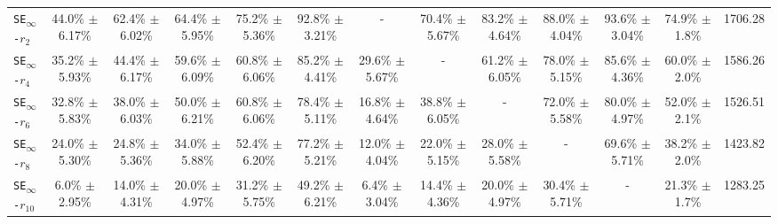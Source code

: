 \begin{table}[ht]
{\begin{tabular}{lcccccccccccc}
\texttt{SE\textsubscript{$\infty$}-$r_2$} & 44.0\% $\pm$ 6.17\% & 62.4\% $\pm$ 6.02\% & 64.4\% $\pm$ 5.95\% & 75.2\% $\pm$ 5.36\% & 92.8\% $\pm$ 3.21\% & - & 70.4\% $\pm$ 5.67\% & 83.2\% $\pm$ 4.64\% & 88.0\% $\pm$ 4.04\% & 93.6\% $\pm$ 3.04\% & 74.9\% $\pm$ 1.8\% & 1706.28\\
\texttt{SE\textsubscript{$\infty$}-$r_4$} & 35.2\% $\pm$ 5.93\% & 44.4\% $\pm$ 6.17\% & 59.6\% $\pm$ 6.09\% & 60.8\% $\pm$ 6.06\% & 85.2\% $\pm$ 4.41\% & 29.6\% $\pm$ 5.67\% & - & 61.2\% $\pm$ 6.05\% & 78.0\% $\pm$ 5.15\% & 85.6\% $\pm$ 4.36\% & 60.0\% $\pm$ 2.0\% & 1586.26\\
\texttt{SE\textsubscript{$\infty$}-$r_6$} & 32.8\% $\pm$ 5.83\% & 38.0\% $\pm$ 6.03\% & 50.0\% $\pm$ 6.21\% & 60.8\% $\pm$ 6.06\% & 78.4\% $\pm$ 5.11\% & 16.8\% $\pm$ 4.64\% & 38.8\% $\pm$ 6.05\% & - & 72.0\% $\pm$ 5.58\% & 80.0\% $\pm$ 4.97\% & 52.0\% $\pm$ 2.1\% & 1526.51\\
\texttt{SE\textsubscript{$\infty$}-$r_8$} &24.0\% $\pm$ 5.30\% & 24.8\% $\pm$ 5.36\% & 34.0\% $\pm$ 5.88\% & 52.4\% $\pm$ 6.20\% & 77.2\% $\pm$ 5.21\% & 12.0\% $\pm$ 4.04\% & 22.0\% $\pm$ 5.15\% & 28.0\% $\pm$ 5.58\% & - & 69.6\% $\pm$ 5.71\% & 38.2\% $\pm$ 2.0\% & 1423.82\\
\texttt{SE\textsubscript{$\infty$}-$r_{10}$} & 6.0\% $\pm$ 2.95\% & 14.0\% $\pm$ 4.31\% & 20.0\% $\pm$ 4.97\% & 31.2\% $\pm$ 5.75\% & 49.2\% $\pm$ 6.21\% & 6.4\% $\pm$ 3.04\% & 14.4\% $\pm$ 4.36\% & 20.0\% $\pm$ 4.97\% & 30.4\% $\pm$ 5.71\% & - & 21.3\% $\pm$ 1.7\% & 1283.25\\
\bottomrule
\end{tabular}%
}
\label{tbl:round_robin}
\end{table}
